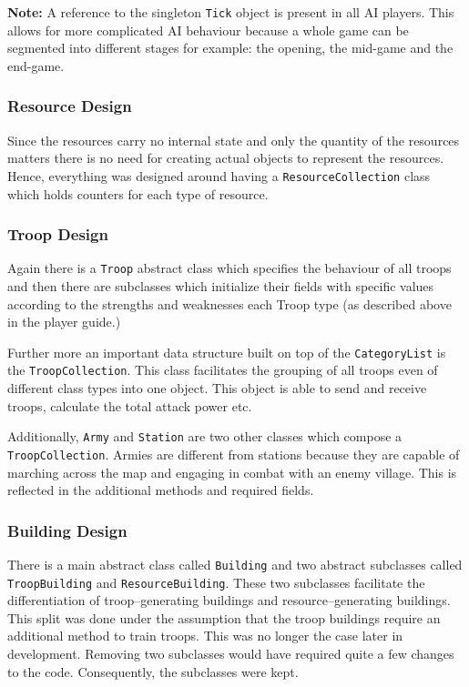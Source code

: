 \documentclass[12pt]{article}
\begin{document}
\textbf{Note:} A reference to the singleton \texttt{Tick} object
is present in all AI players. This allows for more complicated
AI behaviour because a whole game can be segmented into
different stages for example: the opening, the mid-game and the
end-game.

\subsubsection{Resource Design}

Since the resources carry no internal state and only the
quantity of the resources matters there is no need for creating
actual objects to represent the resources. Hence, everything was
designed around having a \texttt{ResourceCollection} class which
holds counters for each type of resource.

\subsubsection{Troop Design}

Again there is a \texttt{Troop} abstract class which specifies
the behaviour of all troops and then there are subclasses which
initialize their fields with specific values according to the
strengths and weaknesses each Troop type (as described above in
the player guide.)

Further more an important data structure built on top of the
\texttt{CategoryList} is the \texttt{TroopCollection}. This
class facilitates the grouping of all troops even of different
class types into one object. This object is able to send and
receive troops, calculate the total attack power etc.

Additionally, \texttt{Army} and \texttt{Station} are two other
classes which compose a \texttt{TroopCollection}. Armies are
different from stations because they are capable of marching
across the map and engaging in combat with an enemy village.
This is reflected in the additional methods and required fields.

\subsubsection{Building Design}

There is a main abstract class called \texttt{Building} and two
abstract subclasses called \texttt{TroopBuilding} and
\texttt{ResourceBuilding}. These two subclasses facilitate the
differentiation of troop--generating buildings and
resource--generating buildings. This split was done under the
assumption that the troop buildings require an additional method
to train troops. This was no longer the case later in
development. Removing two subclasses would have required quite a
few changes to the code. Consequently, the subclasses were kept.
\end{document}
